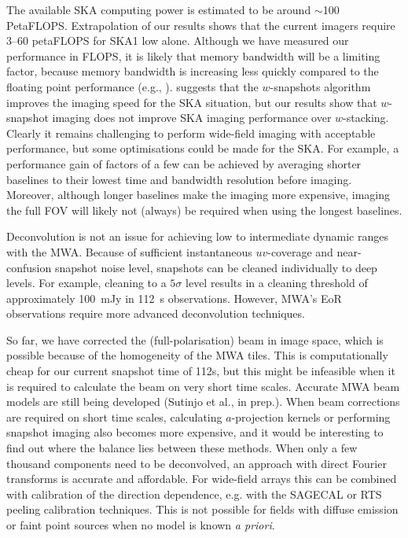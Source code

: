 \documentclass[useAMS,usenatbib]{mn2e}
\newcommand{\editmark}[1]{#1}
\begin{document}
The available SKA computing power is estimated to be around $\sim$100 PetaFLOPS. Extrapolation of our results shows that the current imagers require $3$--$60$ petaFLOPS for SKA1 low alone. Although we have measured our performance in FLOPS, it is likely that memory bandwidth will be a limiting factor, because memory bandwidth is increasing less quickly compared to the floating point performance (e.g., \citealt{gpu-gridding-romein-2012}). \citet{widefield-imaging-ska-cornwell} suggests that the $w$-snapshots algorithm improves the imaging speed for the SKA situation, but our results show that \editmark{$w$-snapshot imaging does not improve SKA imaging performance over $w$-stacking}. Clearly it remains challenging to perform wide-field imaging with acceptable performance, but some optimisations could be made for the SKA. For example, a performance gain of factors of a few can be achieved by averaging shorter baselines to their lowest time and bandwidth resolution before imaging. Moreover, although longer baselines make the imaging more expensive, imaging the full FOV will likely not (always) be required when using the longest baselines.

Deconvolution is not an issue for achieving low to intermediate dynamic ranges with the MWA. Because of sufficient instantaneous $uv$-coverage and near-confusion snapshot noise level, snapshots can be cleaned individually to deep levels. For example, cleaning to a $5\sigma$ level results in a cleaning threshold of approximately 100~mJy in 112~s observations. However, MWA's EoR observations \citep{bowman-science-with-the-mwa-2013} require more advanced deconvolution techniques.

So far, we have corrected the (full-polarisation) beam in image space, which is possible because of the homogeneity of the MWA tiles. This is computationally cheap for our current snapshot time of 112s, but this might be infeasible when it is required to calculate the beam on very short time scales. Accurate MWA beam models are still being developed (Sutinjo et al., in prep.). When beam corrections are required on short time scales, calculating $a$-projection kernels or performing snapshot imaging also becomes more expensive, and it would be interesting to find out where the balance lies between these methods. When only a few thousand components need to be deconvolved, an approach with direct Fourier transforms is accurate and affordable. For wide-field arrays this can be combined with calibration of the direction dependence, e.g. with the SAGECAL \citep{sage-calibration-ii} or RTS peeling \citep{rts-mwa} calibration techniques. This is not possible for fields with diffuse emission or faint point sources when no model is known \textit{a priori}.
\end{document}
